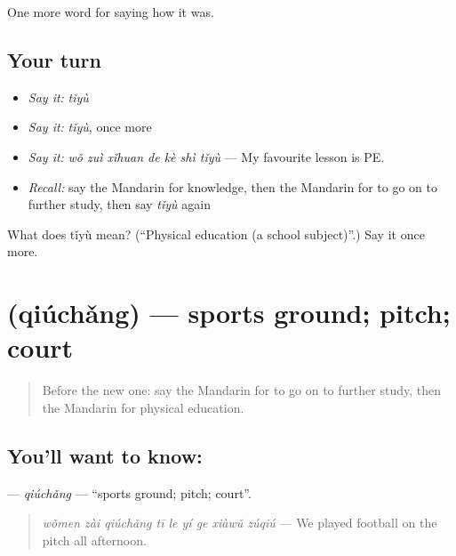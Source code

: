 \begin{grammarlens}[title={What you've built}]
One more word for saying how it was.
\end{grammarlens}

\subsection*{Your turn}
\begin{itemize}
\raggedright
  \item \emph{Say it:} \emph{tǐyù}
  \item \emph{Say it:} \emph{tǐyù}, once more
  \item \emph{Say it:} \emph{wǒ zuì xǐhuan de kè shì tǐyù} — My favourite lesson is PE.
  \item \emph{Recall:} say the Mandarin for knowledge, then the Mandarin for to go on to further study, then say \emph{tǐyù} again
\end{itemize}

\begin{tcolorbox}[breakable,colback=teal!4,colframe=teal!35!black,title={Before you move on}]
What does tǐyù mean? (\textquotedblleft{}Physical education (a school subject)\textquotedblright{}.) Say it once more.
\end{tcolorbox}
\section[\texorpdfstring{\zh{球场} (qiúchǎng)}{球场 (qiúchǎng)}]{ (qiúchǎng) — sports ground; pitch; court}

\label{lesson:ZH-C498-qiuchang}



\begin{quote}
Before the new one: say the Mandarin for to go on to further study, then the Mandarin for physical education.
\end{quote}

\subsection*{You'll want to know: }
\textbf{} — \emph{qiúchǎng} — \textquotedblleft{}sports ground; pitch; court\textquotedblright{}.

\begin{quote}
\emph{wǒmen zài qiúchǎng tī le yí ge xiàwǔ zúqiú} — We played football on the pitch all afternoon.
\end{quote}

